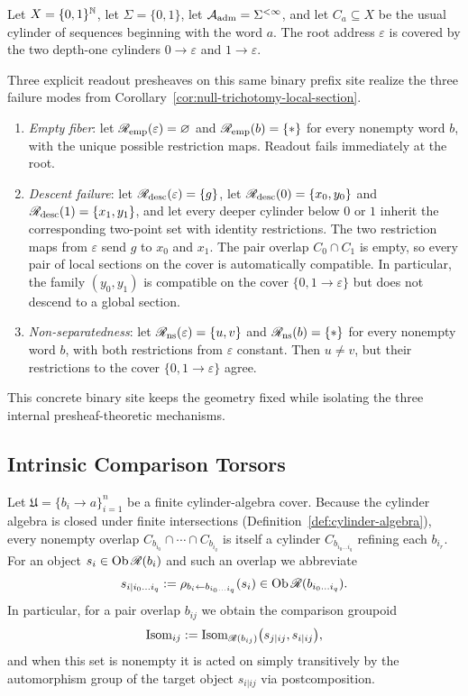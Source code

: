 \begin{example}
\label{ex:binary-prefix-site-failure-modes}
Let $X=\{0,1\}^{\mathbb{N}}$, let $\Sigma=\{0,1\}$, let $\mathcal{A}_{\mathrm{adm}}=\Sigma^{<\infty}$, and
let $C_a\subseteq X$ be the usual cylinder of sequences beginning with the word
$a$.  The root address $\varepsilon$ is covered by the two depth-one cylinders
$0\to \varepsilon$ and $1\to \varepsilon$.

Three explicit readout presheaves on this same binary prefix site realize the
three failure modes from Corollary~\ref{cor:null-trichotomy-local-section}.
\begin{enumerate}[label=\textup{(\arabic*)}]
\item \emph{Empty fiber}: let $\mathscr{R}_{\mathrm{emp}}(\varepsilon)=\varnothing$
and $\mathscr{R}_{\mathrm{emp}}(b)=\{*\}$ for every nonempty word $b$, with the
unique possible restriction maps.  Readout fails immediately at the root.
\item \emph{Descent failure}: let $\mathscr{R}_{\mathrm{desc}}(\varepsilon)=\{g\}$,
let $\mathscr{R}_{\mathrm{desc}}(0)=\{x_0,y_0\}$ and
$\mathscr{R}_{\mathrm{desc}}(1)=\{x_1,y_1\}$, and let every deeper cylinder below
$0$ or $1$ inherit the corresponding two-point set with identity restrictions.
The two restriction maps from $\varepsilon$ send $g$ to $x_0$ and $x_1$.
The pair overlap $C_0\cap C_1$ is empty, so every pair of local sections on the
cover is automatically compatible.  In particular, the family $(y_0,y_1)$ is
compatible on the cover
$\{0,1\to\varepsilon\}$ but does not descend to a global section.
\item \emph{Non-separatedness}: let
$\mathscr{R}_{\mathrm{ns}}(\varepsilon)=\{u,v\}$ and
$\mathscr{R}_{\mathrm{ns}}(b)=\{*\}$ for every nonempty word $b$, with both
restrictions from $\varepsilon$ constant.  Then $u\neq v$, but their
restrictions to the cover $\{0,1\to\varepsilon\}$ agree.
\end{enumerate}
This concrete binary site keeps the geometry fixed while isolating the three
internal presheaf-theoretic mechanisms.
\end{example}

\subsection{Intrinsic Comparison Torsors}
\label{subsec:comparison-torsors}

Let $\mathfrak{U}=\{b_i\to a\}_{i=1}^n$ be a finite cylinder-algebra cover.  Because
the cylinder algebra is closed under finite intersections
(Definition~\ref{def:cylinder-algebra}), every nonempty overlap
$C_{b_{i_0}}\cap\cdots\cap C_{b_{i_q}}$ is itself a cylinder
$C_{b_{i_0\dots i_q}}$ refining each $b_{i_r}$.  For an object
$s_i\in\operatorname{Ob}\mathscr{R}(b_i)$ and such an overlap we abbreviate
\[
s_{i|i_0\dots i_q}
:=
\rho_{b_i\leftarrow b_{i_0\dots i_q}}(s_i)\in\operatorname{Ob}\mathscr{R}(b_{i_0\dots i_q}).
\]
In particular, for a pair overlap $b_{ij}$ we obtain the comparison groupoid
\[
\operatorname{Isom}_{ij}:=
\operatorname{Isom}_{\mathscr{R}(b_{ij})}\bigl(s_{j|ij},s_{i|ij}\bigr),
\]
and when this set is nonempty it is acted on simply transitively by the
automorphism group of the target object $s_{i|ij}$ via postcomposition.

